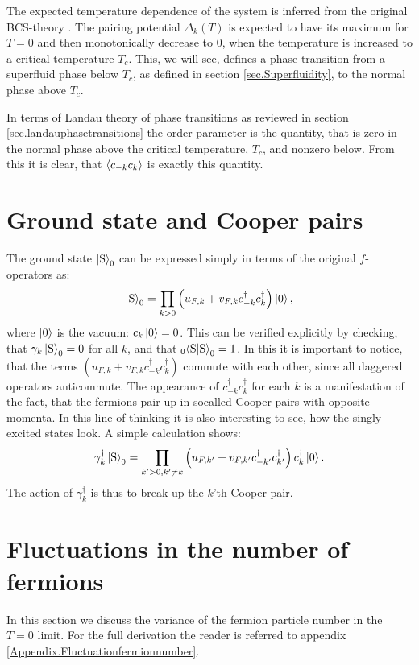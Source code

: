 The expected temperature dependence of the system is inferred from the original BCS-theory \cite[chapter 3]{Tinkham}. The pairing potential $\Delta_k(T)$ is expected to have its maximum for $T = 0$ and then monotonically decrease to 0, when the temperature is increased to a critical temperature $T_c$. This, we will see, defines a phase transition from a superfluid phase below $T_c$, as defined in section \ref{sec.Superfluidity}, to the normal phase above $T_c$. 

In terms of Landau theory of phase transitions as reviewed in section \ref{sec.landauphasetransitions} the order parameter is the quantity, that is zero in the normal phase above the critical temperature, $T_c$, and nonzero below. From this it is clear, that $\braket{c_{-k}c_k}$ is exactly this quantity.

\section{Ground state and Cooper pairs}
The ground state $\ket{\text{S}}_0$ can be expressed simply in terms of the original $f$-operators as:
\begin{equation}
\ket{\text{S}}_0 = \prod_{k > 0} \left(u_{F,k} + v_{F,k}c^\dagger_{-k}c^\dagger_k\right)\ket{0},
\end{equation} 
where $\ket{0}$ is the vacuum: $c_k\ket{0} = 0$. This can be verified explicitly by checking, that $\gamma_k\ket{\text{S}}_0 = 0$ for all $k$, and that $_{0}\!\braket{\text{S}|\text{S}}_0 = 1$. In this it is important to notice, that the terms $(u_{F,k} + v_{F,k}c^\dagger_{-k}c^\dagger_k)$ commute with each other, since all daggered operators anticommute. The appearance of $c^\dagger_{-k}c^\dagger_k$ for each $k$ is a manifestation of the fact, that the fermions pair up in socalled Cooper pairs with opposite momenta. In this line of thinking it is also interesting to see, how the singly excited states look. A simple calculation shows:
\begin{equation}
\gamma^\dagger_k\ket{\text{S}}_0 = \prod_{k' > 0, k' \neq k }\left(u_{F,k'} + v_{F,k'}c^\dagger_{-k'}c^\dagger_{k'}\right)c^\dagger_k\ket{0}.
\end{equation}
The action of $\gamma^\dagger_k$ is thus to break up the $k$'th Cooper pair. 

\section{Fluctuations in the number of fermions}
In this section we discuss the variance of the fermion particle number in the $T = 0$ limit. For the full derivation the reader is referred to appendix \ref{Appendix.Fluctuationfermionnumber}.

